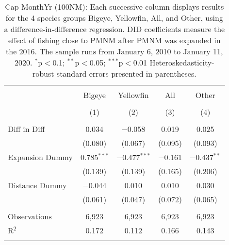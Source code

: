 
\begin{table}[!htbp] \centering 
  \caption{Cap MonthYr (100NM): Each successive column displays results for the 4 species groups Bigeye, Yellowfin, All, and Other, using a difference-in-difference regression. DID coefficients measure the effect of fishing close to PMNM after PMNM was expanded in the 2016. The sample runs from January 6, 2010 to January 11, 2020. $^{*}$p$<$0.1; $^{**}$p$<$0.05; $^{***}$p$<$0.01 Heteroskedasticity-robust standard errors presented in parentheses.} 
  \label{tbl:timeFE100NM} 
\begin{tabular}{@{\extracolsep{5pt}}lcccc} 
\\[-1.8ex]\hline 
\hline \\[-1.8ex] 
 & Bigeye & Yellowfin & All & Other \\ 
\\[-1.8ex] & (1) & (2) & (3) & (4)\\ 
\hline \\[-1.8ex] 
 Diff in Diff & 0.034 & $-$0.058 & 0.019 & 0.025 \\ 
  & (0.080) & (0.067) & (0.095) & (0.093) \\ 
  Expansion Dummy & 0.785$^{***}$ & $-$0.477$^{***}$ & $-$0.161 & $-$0.437$^{**}$ \\ 
  & (0.139) & (0.139) & (0.165) & (0.206) \\ 
  Distance Dummy & $-$0.044 & 0.010 & 0.010 & 0.030 \\ 
  & (0.061) & (0.047) & (0.072) & (0.065) \\ 
 \hline \\[-1.8ex] 
Observations & 6,923 & 6,923 & 6,923 & 6,923 \\ 
R$^{2}$ & 0.172 & 0.112 & 0.166 & 0.143 \\ 
\hline 
\hline \\[-1.8ex] 
\end{tabular} 
\end{table} 
